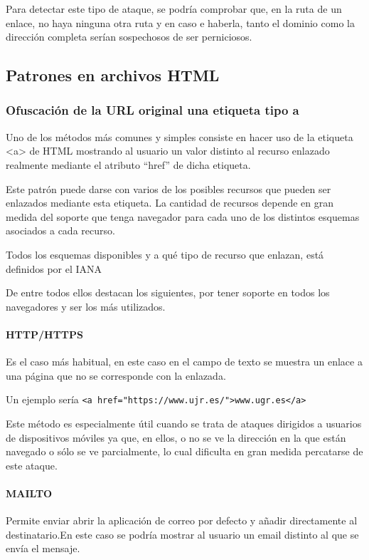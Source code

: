 Para detectar este tipo de ataque, se podría comprobar que, en la ruta de un enlace, no haya ninguna otra ruta y en caso e haberla, tanto el dominio como la dirección completa serían sospechosos de ser perniciosos. 

\subsection{Patrones en archivos HTML}
\subsubsection{Ofuscación de la URL original una etiqueta tipo a}
Uno de los métodos más comunes y simples consiste en hacer uso de la etiqueta <a> de HTML mostrando al usuario un valor distinto al recurso enlazado realmente mediante el atributo “href” de dicha etiqueta. 

Este patrón puede darse con varios de los posibles recursos que pueden ser enlazados mediante esta etiqueta. La cantidad de recursos depende en gran medida del soporte que tenga navegador para cada uno de los distintos esquemas asociados a cada recurso.

Todos los esquemas disponibles y a qué tipo de recurso que enlazan, está definidos por el IANA \cite{Schemas_dispo}

De entre todos ellos destacan los siguientes, por tener soporte en todos los navegadores y ser los más utilizados.

\paragraph{HTTP/HTTPS}
Es el caso más habitual, en este caso en el campo de texto se muestra un enlace a una página que no se corresponde con la enlazada. 

Un ejemplo sería \verb|<a href="https://www.ujr.es/">www.ugr.es</a>|

Este método es especialmente útil cuando se trata de ataques dirigidos a usuarios de dispositivos móviles ya que, en ellos, o no se ve la dirección en la que están navegado o sólo se ve parcialmente, lo cual dificulta en gran medida percatarse de este ataque. 

\paragraph{MAILTO}
Permite enviar abrir la aplicación de correo por defecto y añadir directamente al destinatario.En este caso se podría mostrar al usuario un email distinto al que se envía el mensaje. 

